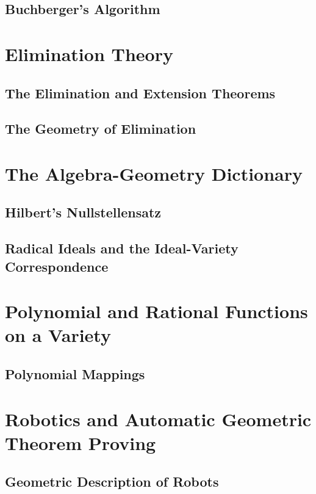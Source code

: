 \subsection{Buchberger's Algorithm}






\section{Elimination Theory}



\subsection{The Elimination and Extension Theorems}


\subsection{The Geometry of Elimination}



\section{The Algebra-Geometry Dictionary}


\subsection{Hilbert's Nullstellensatz}


\subsection{Radical Ideals and the Ideal-Variety Correspondence}



\section{Polynomial and Rational Functions on a Variety}


\subsection{Polynomial Mappings }


\section{Robotics and Automatic Geometric Theorem Proving}



\subsection{Geometric Description of Robots}






